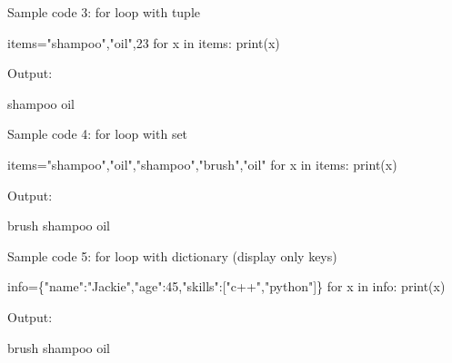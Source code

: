 \begin{flushleft}
	\bigskip	
	Sample code 3: for loop with tuple
	\begin{tcolorbox}[breakable,notitle,boxrule=-0pt,colback=code,colframe=code]
		\color{white}
		\font=8pt
		items="shampoo","oil",23 \newline
		for x in items: \newline
		\hphantom{} \hphantom{}	print(x)
		\font=4pt
	\end{tcolorbox}
	
	Output:
	\begin{tcolorbox}[breakable,notitle,boxrule=-0pt,colback=output,colframe=output]
		\color{black}
		shampoo \newline
		oil 
		\font=4pt
	\end{tcolorbox}
	
	\bigskip	
	Sample code 4: for loop with set
	\begin{tcolorbox}[breakable,notitle,boxrule=-0pt,colback=code,colframe=code]
		\color{white}
		\font=8pt
		items={"shampoo","oil","shampoo","brush","oil"} \newline
		for x in items: \newline
		\hphantom{} \hphantom{}	print(x)
		\font=4pt
	\end{tcolorbox}
	
	Output:
	\begin{tcolorbox}[breakable,notitle,boxrule=-0pt,colback=output,colframe=output]
		\color{black}
		brush \newline
		shampoo \newline
		oil
		\font=4pt
	\end{tcolorbox}

	\bigskip	
	Sample code 5: for loop with dictionary (display only keys)
	\begin{tcolorbox}[breakable,notitle,boxrule=-0pt,colback=code,colframe=code]
		\color{white}
		\font=8pt
		info=\{"name":"Jackie","age":45,"skills":["c++","python"]\} \newline
		for x in info: \newline
		\hphantom{} \hphantom{}	print(x)
		\font=4pt
	\end{tcolorbox}
	
	Output:
	\begin{tcolorbox}[breakable,notitle,boxrule=-0pt,colback=output,colframe=output]
		\color{black}
		brush \newline
		shampoo \newline
		oil
		\font=4pt
	\end{tcolorbox}


\end{flushleft}

